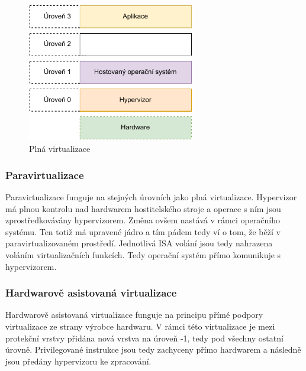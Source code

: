 \begin{figure}[htbp]
    \centering 
    \includegraphics[width=0.65\textwidth]{assets/img/full_virt.pdf}
    \caption{Plná virtualizace}
    \label{fig:full_virt}
\end{figure}


\subsubsection{Paravirtualizace}

Paravirtualizace funguje na stejných úrovních jako plná virtualizace. Hypervizor má plnou kontrolu nad hardwarem hostitelského stroje a operace s ním jsou zprostředkovávány hypervizorem. Změna ovšem nastává v rámci operačního systému. Ten totiž má upravené jádro a tím pádem tedy ví o tom, že běží v paravirtualizovaném prostředí. Jednotlivá ISA volání jsou tedy nahrazena voláním virtualizačních funkcích. Tedy operační systém přímo komunikuje s hypervizorem.\cite{4709159}


\subsubsection{Hardwarově asistovaná virtualizace}

Hardwarově asistovaná virtualizace funguje na principu přímé podpory virtualizace ze strany výrobce hardwaru. V rámci této virtualizace je mezi protekční vrstvy přidána nová vrstva na úroveň -1, tedy pod všechny ostatní úrovně. Privilegované instrukce jsou tedy zachyceny přímo hardwarem a následně jsou předány hypervizoru ke zpracování.\cite{4709159}

